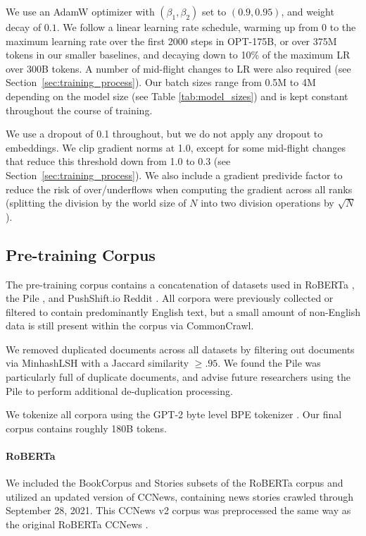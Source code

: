 \documentclass[11pt]{article}
\begin{document}
We use an AdamW optimizer \cite{AdamW} with $(\beta_1,\beta_2)$ set to $(0.9, 0.95)$, and weight decay of $0.1$.  We follow a linear learning rate schedule, warming up from $0$ to the maximum learning rate over the first 2000 steps in OPT-175B, or over 375M tokens in our smaller baselines, and decaying down to 10\% of the maximum LR over 300B tokens.  A number of mid-flight changes to LR were also required (see Section~\ref{sec:training_process}).  Our batch sizes range from 0.5M to 4M depending on the model size (see Table \ref{tab:model_sizes}) and is kept constant throughout the course of training.

We use a dropout of 0.1 throughout, but we do not apply any dropout to embeddings. We clip gradient norms at 1.0, except for some mid-flight changes that reduce this threshold down from 1.0 to 0.3 (see Section~\ref{sec:training_process}).  We also include a gradient predivide factor to reduce the risk of over/underflows when computing the gradient across all ranks (splitting the division by the world size of $N$ into two division operations by $\sqrt{N}$).

\subsection{Pre-training Corpus}
\label{sec:training_dataset}
The pre-training corpus contains a concatenation of datasets used in RoBERTa \cite{liu2019roberta}, the Pile \cite{thepile}, and PushShift.io Reddit \cite{reddit2020, roller-etal-2021-recipes}. All corpora were previously collected or filtered to contain predominantly English text, but a small amount of non-English data is still present within the corpus via CommonCrawl.

We removed duplicated documents across all datasets by filtering out documents via MinhashLSH \cite{rajaraman2011mining} with a Jaccard similarity $\geq.95$. We found the Pile was particularly full of duplicate documents, and advise future researchers using the Pile to perform additional de-duplication processing.

We tokenize all corpora using the GPT-2 byte level BPE tokenizer \cite{sennrich2016bpe,radford2019language,brown2020gpt3}. Our final corpus contains roughly 180B tokens.

\paragraph{RoBERTa} We included the BookCorpus \cite{books2015} and Stories \cite{ccstories2018} subsets of the RoBERTa corpus and utilized an updated version of CCNews, containing news stories crawled through September 28, 2021. This CCNews v2 corpus was preprocessed the same way as the original RoBERTa CCNews \cite{liu2019roberta}.
\end{document}
